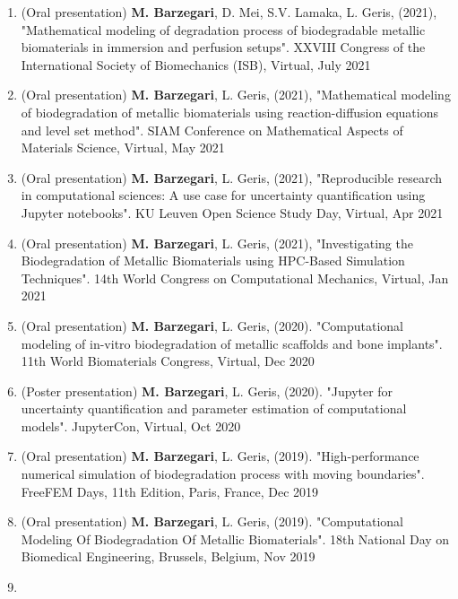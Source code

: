 \documentclass{cv}
\begin{document}
\begin{enumerate}
\item
(Oral presentation)
\textbf{M. Barzegari}, D. Mei, S.V. Lamaka, L. Geris, (2021), "Mathematical modeling of degradation process of biodegradable metallic biomaterials in immersion and perfusion setups". XXVIII Congress of the International Society of Biomechanics (ISB), Virtual, July 2021
\item
(Oral presentation)
\textbf{M. Barzegari}, L. Geris, (2021), "Mathematical modeling of biodegradation of metallic biomaterials using reaction-diffusion equations and level set method". SIAM Conference on Mathematical Aspects of Materials Science, Virtual, May 2021
\item
(Oral presentation)
\textbf{M. Barzegari}, L. Geris, (2021), "Reproducible research in computational sciences: A use case for uncertainty quantification using Jupyter notebooks". KU Leuven Open Science Study Day, Virtual, Apr 2021
\item
(Oral presentation)
\textbf{M. Barzegari}, L. Geris, (2021), "Investigating the Biodegradation of Metallic Biomaterials using HPC-Based Simulation Techniques". 14th World Congress on Computational Mechanics, Virtual, Jan 2021
\item
(Oral presentation) 
\textbf{M. Barzegari}, L. Geris, (2020). "Computational modeling of in-vitro biodegradation of metallic scaffolds and bone implants". 11th World Biomaterials Congress, Virtual, Dec 2020
\item
(Poster presentation) 
\textbf{M. Barzegari}, L. Geris, (2020). "Jupyter for uncertainty quantification and parameter estimation of computational models". JupyterCon, Virtual, Oct 2020
\item
(Oral presentation) 
\textbf{M. Barzegari}, L. Geris, (2019). "High-performance numerical simulation of biodegradation process with moving boundaries". FreeFEM Days, 11th Edition, Paris, France, Dec 2019
\item
(Oral presentation) 
\textbf{M. Barzegari}, L. Geris, (2019). "Computational Modeling Of Biodegradation Of Metallic Biomaterials". 18th National Day on Biomedical Engineering, Brussels, Belgium, Nov 2019
\item

\end{enumerate}
\end{document}
